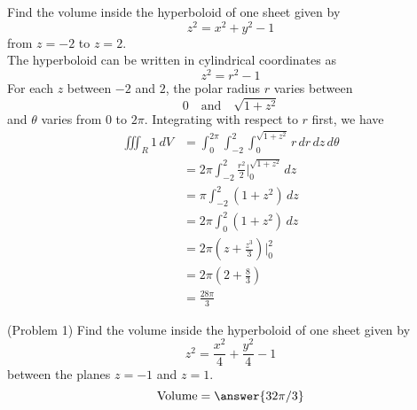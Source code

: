 \documentclass[handout]{ximera}
\begin{document}
\begin{example}[Example 1]
Find the volume inside the hyperboloid of one sheet given by
\[
z^2 =  x^2 + y^2 -1
\]
from $z = -2$ to $z = 2$.\\
The hyperboloid can be written in cylindrical coordinates as
\[
z^2 = r^2 -1
\]
For each $z$ between $-2$ and $2$, the polar radius $r$ varies between 
\[
0 \quad \text{and} \quad \sqrt{1 + z^2}
\]
and $\theta$ varies from $0$ to $2\pi$.
Integrating with respect to $r$ first, we have
\begin{align*}
\iiint_R 1 \, dV &= \int_0^{2\pi} \int_{-2}^2 \int_0^{\sqrt{1+z^2}} r \, dr \, dz \, d\theta\\
                 &= 2\pi  \int_{-2}^2 \frac{r^2}{2} \bigg|_0^{\sqrt{1+z^2}}  \, dz\\
                 &= \pi \int_{-2}^2 (1+z^2) \, dz\\
                 &= 2\pi \int_0^2 (1+z^2) \, dz\\
                 &= 2\pi \left(z + \frac{z^3}{3}\right)\bigg|_0^2\\
                 &= 2\pi \left(2 + \frac83\right)\\
                 &= \frac{28\pi}{3}
\end{align*}
            
\begin{image}
\end{image}

                 
\end{example}

\begin{problem}(Problem 1)
Find the volume inside the hyperboloid of one sheet given by
\[
z^2 =  \frac{x^2}{4} + \frac{y^2}{4} -1
\]
between the planes $z = -1$ and $z = 1$.\\
\[
\text{Volume} = \answer{32\pi/3}
\]
\end{problem}
\end{document}
